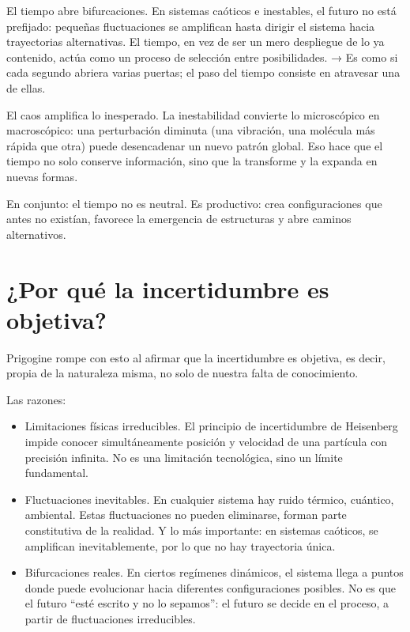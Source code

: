 \documentclass[
  11pt,
  a4paper,
  DIV=11,
  numbers=noendperiod]{scrreprt}
\begin{document}
El tiempo abre bifurcaciones. En sistemas caóticos e inestables, el
futuro no está prefijado: pequeñas fluctuaciones se amplifican hasta
dirigir el sistema hacia trayectorias alternativas. El tiempo, en vez de
ser un mero despliegue de lo ya contenido, actúa como un proceso de
selección entre posibilidades. → Es como si cada segundo abriera varias
puertas; el paso del tiempo consiste en atravesar una de ellas.

El caos amplifica lo inesperado. La inestabilidad convierte lo
microscópico en macroscópico: una perturbación diminuta (una vibración,
una molécula más rápida que otra) puede desencadenar un nuevo patrón
global. Eso hace que el tiempo no solo conserve información, sino que la
transforme y la expanda en nuevas formas.

En conjunto: el tiempo no es neutral. Es productivo: crea
configuraciones que antes no existían, favorece la emergencia de
estructuras y abre caminos alternativos.

\section{¿Por qué la incertidumbre es
objetiva?}\label{por-quuxe9-la-incertidumbre-es-objetiva}

Prigogine rompe con esto al afirmar que la incertidumbre es objetiva, es
decir, propia de la naturaleza misma, no solo de nuestra falta de
conocimiento.

Las razones:

\begin{itemize}
\item
  Limitaciones físicas irreducibles. El principio de incertidumbre de
  Heisenberg impide conocer simultáneamente posición y velocidad de una
  partícula con precisión infinita. No es una limitación tecnológica,
  sino un límite fundamental.
\item
  Fluctuaciones inevitables. En cualquier sistema hay ruido térmico,
  cuántico, ambiental. Estas fluctuaciones no pueden eliminarse, forman
  parte constitutiva de la realidad. Y lo más importante: en sistemas
  caóticos, se amplifican inevitablemente, por lo que no hay trayectoria
  única.
\item
  Bifurcaciones reales. En ciertos regímenes dinámicos, el sistema llega
  a puntos donde puede evolucionar hacia diferentes configuraciones
  posibles. No es que el futuro ``esté escrito y no lo sepamos'': el
  futuro se decide en el proceso, a partir de fluctuaciones
  irreducibles.
\end{itemize}
\end{document}
